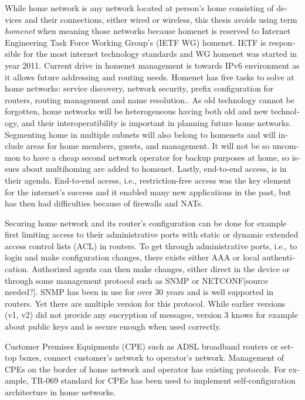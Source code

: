 \documentclass[12pt,a4paper,english]{tutthesis}
\begin{document}
\begin{otherlanguage}{english}
While home network is any network located at person's home consisting
of devices and their connections, either wired or wireless,
this thesis avoids using term \emph{homenet} when meaning those networks
because  homenet  is  reserved to 
Internet Engineering Task Force Working Group's (IETF
WG) homenet. IETF is responsible for the most internet technology standards and 
WG homenet was started in year 2011.
Current drive in homenet management is towards IPv6 environment
 as it allows future addressing and routing needs. 
Homenet has five tasks to solve at home networks: service discovery, network security, 
prefix configuration for routers, routing management and name
resolution.\cite{homenet-charter}.
As old technology cannot be forgotten, home networks will be heterogeneous having both
old and new technology, and their interoperatibility is important in
planning future home networks. 
Segmenting home in multiple subnets will also belong
to homenets and will include areas for home members, guests,
and management. It will not be so uncommon to have a cheap second
network operator for backup purposes at home, so issues about
multihoming are added to homenet.
Lastly, end-to-end access, is in their
agenda. End-to-end access, i.e., restriction-free access was the key
element for the internet's success and it enabled many new
applications in the past, but has then had difficulties because of
firewalls and NATs.



Securing home network and its router's configuration can be done for
example first limiting access to their administrative ports
with static or dynamic extended access control lists (ACL) in
routers. To get through administrative ports, i.e., to login and make
configuration changes, there exists either AAA or local authentication.
Authorized agents can then make changes, either direct in the device or through some
management protocol such as SNMP or NETCONF[source needed?].  SNMP has been in
use for over 30 years and is well supported in routers. Yet there are
multiple version for this protocol. While earlier versions (v1, v2)
did not provide any encryption of messages, version 3 knows for example
about public keys and is secure enough when used correctly.


Customer Premises Equipments (CPE) such as ADSL broadband routers or
set-top boxes, connect customer's network to operator's network.
Management of CPEs on the border of home network and operator has 
existing protocols. For example, TR-069 standard\cite{iptvtr069} for CPEs
has been used to implement self-configuration archi\-tecture in
home networks\cite{tr069rachidi2011}.



\end{otherlanguage}
\end{document}
